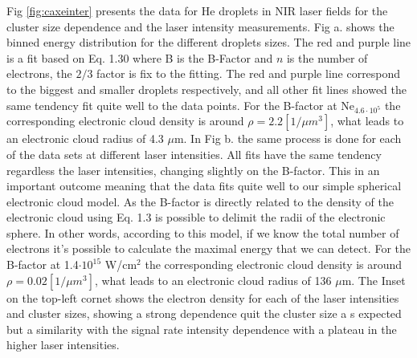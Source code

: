 Fig \ref{fig:caxeinter} presents the data for He droplets in NIR laser fields for the cluster size dependence and the laser intensity measurements. Fig a. shows the binned energy distribution for the different droplets sizes. The red and purple line is a fit based on Eq. 1.30 where B is the B-Factor and $n$ is the number of electrons, the $2/3$ factor is fix to the fitting. The red and purple line correspond to the biggest and smaller droplets respectively, and all other fit lines showed the same tendency fit quite well to the data points. For the B-factor at Ne$_{4.6\cdot10^{5}}$ the corresponding electronic cloud density is around $\rho =2.2 [1/\mu m^{3}]$, what leads to an electronic cloud radius of  4.3 $\mu$m.
In Fig b. the same process is done for each of the data sets at different laser intensities. All fits have the same tendency regardless the laser intensities, changing slightly on the B-factor. This in an important outcome meaning that the data fits quite well to our simple spherical electronic cloud model. As the B-factor is directly related to the density of the electronic cloud using Eq. 1.3 is possible to delimit the radii of the electronic sphere. In other words, according to this model, if we know the total number of electrons it’s possible to calculate the maximal energy that we can detect. For the B-factor at 1.4$\cdot10^15$ W/cm$^{2}$ the corresponding electronic cloud density is around $\rho =0.02 [1/\mu m^{3}]$, what leads to an electronic cloud radius of  136 $\mu$m. The Inset on the top-left cornet shows the electron density for each of the laser intensities and cluster sizes, showing a strong dependence quit the cluster size a s expected but a similarity with the signal rate intensity dependence with a plateau in the higher laser intensities.


